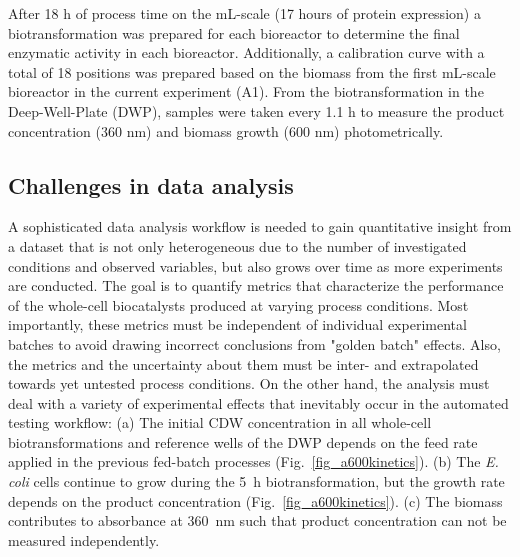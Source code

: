 \documentclass[sn-standardnature]{sn-jnl}%
\theoremstyle{thmstyleone}%
\theoremstyle{thmstyletwo}%
\theoremstyle{thmstylethree}%
\begin{document}
After 18 h of process time on the mL-scale (17 hours of protein expression) a biotransformation was prepared for each bioreactor to determine the final enzymatic activity in each bioreactor.
Additionally, a calibration curve with a total of 18 positions was prepared based on the biomass from the first mL-scale bioreactor in the current experiment (A1).
From the biotransformation in the Deep-Well-Plate (DWP), samples were taken every 1.1 h to measure the product concentration (360 nm) and biomass growth (600 nm) photometrically.

\subsection{Challenges in data analysis}
A sophisticated data analysis workflow is needed to gain quantitative insight from a dataset that is not only heterogeneous due to the number of investigated conditions and observed variables, but also grows over time as more experiments are conducted.
The goal is to quantify metrics that characterize the performance of the whole-cell biocatalysts produced at varying process conditions.
Most importantly, these metrics must be independent of individual experimental batches to avoid drawing incorrect conclusions from "golden batch" effects.
Also, the metrics and the uncertainty about them must be inter- and extrapolated towards yet untested process conditions.
On the other hand, the analysis must deal with a variety of experimental effects that inevitably occur in the automated testing workflow:
(a) The initial CDW concentration in all whole-cell biotransformations and reference wells of the DWP depends on the feed rate applied in the previous fed-batch processes (Fig.~\ref{fig_a600kinetics}).
(b) The \textit{E. coli} cells continue to grow during the 5~h biotransformation, but the growth rate depends on the product concentration (Fig.~\ref{fig_a600kinetics}).
(c) The biomass contributes to absorbance at 360~nm such that product concentration can not be measured independently.
\end{document}
